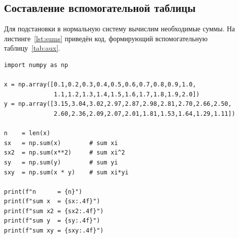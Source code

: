 \documentclass[a4paper, final]{article}
\begin{document}
\subsection{Составление вспомогательной таблицы}

Для подстановки в нормальную систему вычислим необходимые суммы.
На листинге~\ref{lst:sums} приведён код, формирующий вспомогательную
таблицу~\ref{tab:aux}.

\begin{lstlisting}[caption={Вычисление вспомогательных сумм}, label=lst:sums]
import numpy as np

x = np.array([0.1,0.2,0.3,0.4,0.5,0.6,0.7,0.8,0.9,1.0,
              1.1,1.2,1.3,1.4,1.5,1.6,1.7,1.8,1.9,2.0])
y = np.array([3.15,3.04,3.02,2.97,2.87,2.98,2.81,2.70,2.66,2.50,
              2.60,2.36,2.09,2.07,2.01,1.81,1.53,1.64,1.29,1.11])

n    = len(x)
sx   = np.sum(x)        # sum xi
sx2  = np.sum(x**2)     # sum xi^2
sy   = np.sum(y)        # sum yi
sxy  = np.sum(x * y)    # sum xi*yi

print(f"n      = {n}")
print(f"sum x  = {sx:.4f}")
print(f"sum x2 = {sx2:.4f}")
print(f"sum y  = {sy:.4f}")
print(f"sum xy = {sxy:.4f}")
\end{lstlisting}
\end{document}
